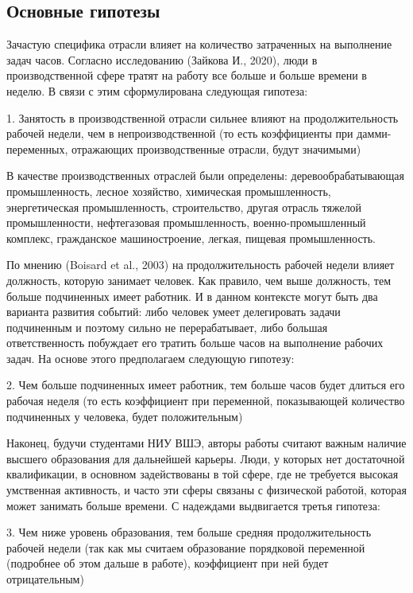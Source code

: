 \documentclass[12pt, a4paper]{article}
\begin{document}
{\subsection{Основные гипотезы}

Зачастую специфика отрасли влияет на количество затраченных на выполнение задач часов. Согласно исследованию (Зайкова И., 2020), люди в производственной сфере тратят на работу все больше и больше времени в неделю. В связи с этим сформулирована следующая гипотеза:

1.  Занятость в производственной отрасли сильнее влияют на продолжительность рабочей недели, чем в непроизводственной (то есть коэффициенты при дамми-переменных, отражающих производственные отрасли, будут значимыми)

В качестве производственных отраслей были определены: деревообрабатывающая промышленность, лесное хозяйство, химическая промышленность, энергетическая промышленность, строительство, другая отрасль тяжелой промышленности, нефтегазовая промышленность, военно-промышленный комплекс, гражданское машиностроение, легкая, пищевая промышленность.

По мнению (Boisard et al., 2003) на продолжительность рабочей недели влияет должность, которую занимает человек. Как правило, чем выше должность, тем больше подчиненных имеет работник. И в данном контексте могут быть два варианта развития событий: либо человек умеет делегировать задачи подчиненным и поэтому сильно не перерабатывает, либо большая ответственность побуждает его тратить больше часов на выполнение рабочих задач. На основе этого предполагаем следующую гипотезу:

2.  Чем больше подчиненных имеет работник, тем больше часов будет длиться его рабочая неделя (то есть коэффициент при переменной, показывающей количество подчиненных у человека, будет положительным)

Наконец, будучи студентами НИУ ВШЭ, авторы работы считают важным наличие высшего образования для дальнейшей карьеры. Люди, у которых нет достаточной квалификации, в основном задействованы в той сфере, где не требуется высокая умственная активность, и часто эти сферы связаны с физической работой, которая может занимать больше времени. С надеждами выдвигается третья гипотеза:

3.  Чем ниже уровень образования, тем больше средняя продолжительность рабочей недели (так как мы считаем образование порядковой переменной (подробнее об этом дальше в работе), коэффициент при ней будет отрицательным)

}
\end{document}
